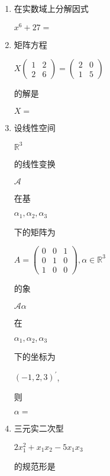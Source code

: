 \documentclass[10pt]{article}
\begin{document}
\begin{enumerate}
  \item \begin{CJK}{UTF8}{mj}在实数域上分解因式\end{CJK} $x^{6}+27=$

  \item \begin{CJK}{UTF8}{mj}矩阵方程\end{CJK} $X\left(\begin{array}{ll}1 & 2 \\ 2 & 6\end{array}\right)=\left(\begin{array}{ll}2 & 0 \\ 1 & 5\end{array}\right)$ \begin{CJK}{UTF8}{mj}的解是\end{CJK} $X=$

  \item \begin{CJK}{UTF8}{mj}设线性空间\end{CJK} $\mathbb{R}^{3}$ \begin{CJK}{UTF8}{mj}的线性变换\end{CJK} $\mathscr{A}$ \begin{CJK}{UTF8}{mj}在基\end{CJK} $\alpha_{1}, \alpha_{2}, \alpha_{3}$ \begin{CJK}{UTF8}{mj}下的矩阵为\end{CJK} $A=\left(\begin{array}{lll}0 & 0 & 1 \\ 0 & 1 & 0 \\ 1 & 0 & 0\end{array}\right), \alpha \in \mathbb{R}^{3}$ \begin{CJK}{UTF8}{mj}的象\end{CJK} $\mathscr{A} \alpha$ \begin{CJK}{UTF8}{mj}在\end{CJK} $\alpha_{1}, \alpha_{2}, \alpha_{3}$ \begin{CJK}{UTF8}{mj}下的坐标为\end{CJK} $(-1,2,3)^{\prime}$, \begin{CJK}{UTF8}{mj}则\end{CJK} $\alpha=$

  \item \begin{CJK}{UTF8}{mj}三元实二次型\end{CJK} $2 x_{1}^{2}+x_{1} x_{2}-5 x_{1} x_{3}$ \begin{CJK}{UTF8}{mj}的规范形是\end{CJK}


\end{enumerate}
\end{document}
